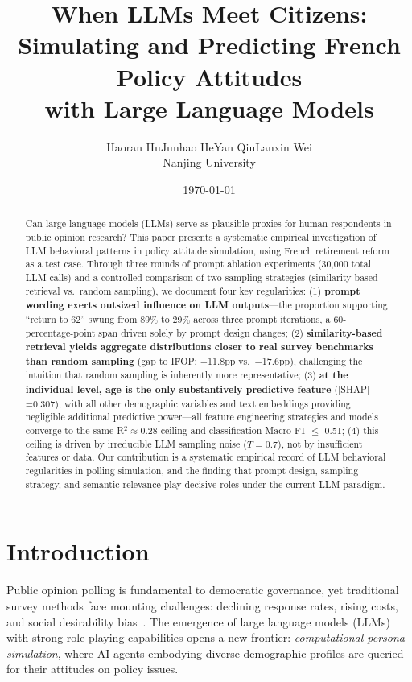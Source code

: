 \documentclass[11pt,a4paper]{article}
\title{\textbf{When LLMs Meet Citizens: \\Simulating and Predicting French Policy Attitudes\\with Large Language Models}}
\author{
    \large Haoran Hu\quad Junhao He\quad Yan Qiu\quad Lanxin Wei\\
    \normalsize Nanjing University
}
\date{\today}
\begin{document}
\maketitle

\begin{abstract}
Can large language models (LLMs) serve as plausible proxies for human respondents in public opinion research? This paper presents a systematic empirical investigation of LLM behavioral patterns in policy attitude simulation, using French retirement reform as a test case. Through three rounds of prompt ablation experiments (30,000 total LLM calls) and a controlled comparison of two sampling strategies (similarity-based retrieval vs.\ random sampling), we document four key regularities: (1) \textbf{prompt wording exerts outsized influence on LLM outputs}---the proportion supporting ``return to 62'' swung from 89\% to 29\% across three prompt iterations, a 60-percentage-point span driven solely by prompt design changes; (2) \textbf{similarity-based retrieval yields aggregate distributions closer to real survey benchmarks than random sampling} (gap to IFOP: +11.8pp vs.\ $-$17.6pp), challenging the intuition that random sampling is inherently more representative; (3) \textbf{at the individual level, age is the only substantively predictive feature} ($|$SHAP$|$=0.307), with all other demographic variables and text embeddings providing negligible additional predictive power---all feature engineering strategies and models converge to the same R$^2 \approx 0.28$ ceiling and classification Macro F1 $\leq$ 0.51; (4) this ceiling is driven by irreducible LLM sampling noise ($T=0.7$), not by insufficient features or data. Our contribution is a systematic empirical record of LLM behavioral regularities in polling simulation, and the finding that prompt design, sampling strategy, and semantic relevance play decisive roles under the current LLM paradigm.
\end{abstract}

\section{Introduction}

Public opinion polling is fundamental to democratic governance, yet traditional survey methods face mounting challenges: declining response rates, rising costs, and social desirability bias~\cite{groves2009survey}. The emergence of large language models (LLMs) with strong role-playing capabilities opens a new frontier: \textit{computational persona simulation}, where AI agents embodying diverse demographic profiles are queried for their attitudes on policy issues.
\end{document}
